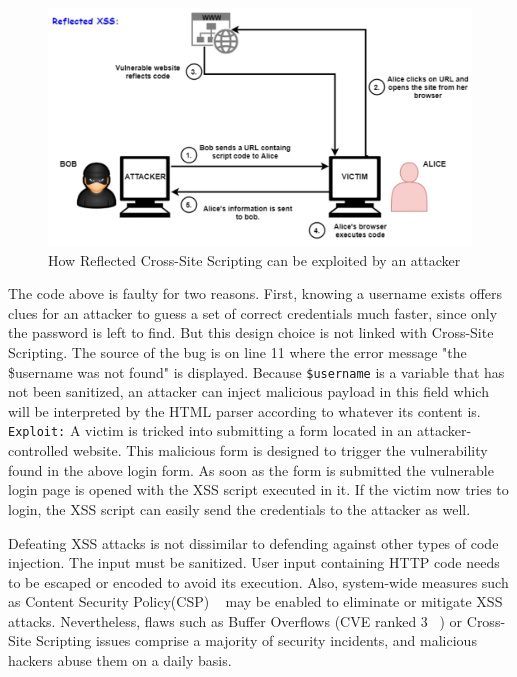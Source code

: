 \begin{figure}[ht]
 \centering
 \captionsetup{justification=centering}
 \includegraphics[width=\linewidth]{figures/reflectedxss.pdf}
 \caption{How Reflected Cross-Site Scripting can be exploited by an attacker}
 \label{fig:reflectedxss}
\end{figure}


The code above is faulty for two reasons. First, knowing a username exists offers clues for an attacker to guess a set of correct credentials much faster, since only the password is left to find. But this design choice is not linked with Cross-Site Scripting. The source of the bug is on line 11 where the error message "the \$username was not found" is displayed. Because {\tt \$username} is a variable that has not been sanitized, an attacker can inject malicious payload in this field which will be interpreted by the HTML parser according to whatever its content is. 
{\tt Exploit:} A victim is tricked into submitting a form located in an attacker-controlled website. This malicious form is designed to trigger the vulnerability found in the above login form. As soon as the form is submitted the vulnerable login page is opened with the XSS script executed in it. If the victim now tries to login, the XSS script can easily send the
credentials to the attacker as well. 

Defeating XSS attacks is not dissimilar to defending against other types of code injection.
The input must be sanitized. User input containing HTTP code needs to be escaped or encoded to avoid its execution. Also, system-wide measures such as Content Security Policy(CSP) ~\cite{csp_def} may be enabled to eliminate or mitigate XSS attacks. Nevertheless, flaws such as Buffer Overflows (CVE ranked 3 ~\cite{cve}) or Cross-Site Scripting issues comprise a majority of security incidents, and malicious hackers abuse them on a daily basis. 

